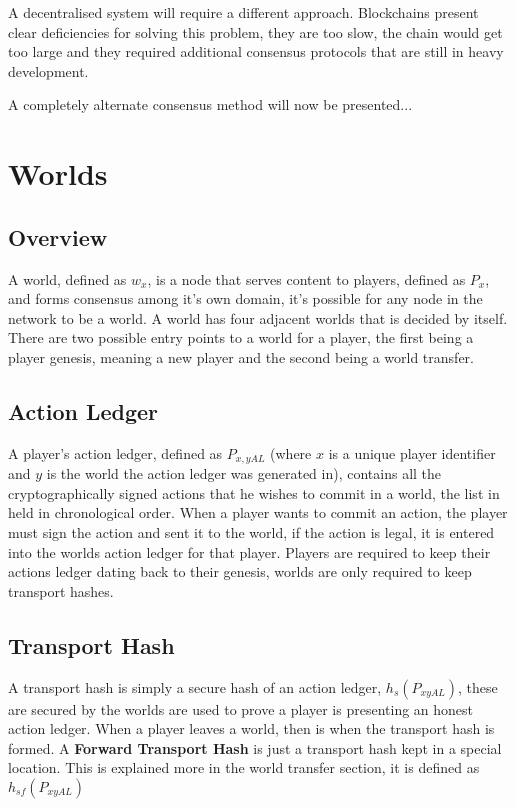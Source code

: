 \documentclass[runningheads,a4paper]{llncs}
\begin{document}
A decentralised system will require a different approach. Blockchains present clear deficiencies for solving this problem, they are too slow, the chain would get too large and they required additional consensus protocols that are still in heavy development. 

A completely alternate consensus method will now be presented...

\section{Worlds}

\subsection{Overview}
A world, defined as $w_x$, is a node that serves content to players, defined as $P_x$, and forms consensus among it's own domain, it's possible for any node in the network to be a world. A world has four adjacent worlds that is decided by itself. There are two possible entry points to a world for a player, the first being a player genesis, meaning a new player and the second being a world transfer.

\subsection{Action Ledger}
A player's action ledger, defined as $P_{x,yAL}$ (where $x$ is a unique player identifier and $y$ is the world the action ledger was generated in), contains all the cryptographically signed actions that he wishes to commit in a world, the list in held in chronological order. When a player wants to commit an action, the player must sign the action and sent it to the world, if the action is legal, it is entered into the worlds action ledger for that player. Players are required to keep their actions ledger dating back to their genesis, worlds are only required to keep transport hashes.

\subsection{Transport Hash}
A transport hash is simply a secure hash of an action ledger, $h_s(P_{xyAL})$, these are secured by the worlds are used to prove a player is presenting an honest action ledger. When a player leaves a world, then is when the transport hash is formed. A \textbf{Forward Transport Hash} is just a transport hash kept in a special location. This is explained more in the world transfer section, it is defined as  $h_{sf}(P_{xyAL})$
\end{document}
